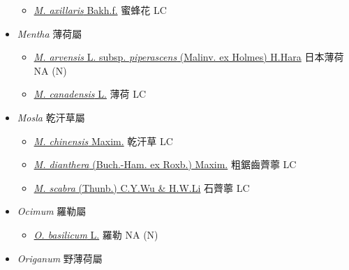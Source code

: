 \begin{itemize}
  \begin{itemize}
        \item[] \href{http://www.theplantlist.org/tpl1.1/search?q=Melissa+axillaris}{\textit{M. axillaris} Bakh.f.}   蜜蜂花   LC
  \end{itemize}
 \item[] \textit{Mentha} 薄荷屬
                                
  \begin{itemize}
        \item[] \href{http://www.theplantlist.org/tpl1.1/search?q=Mentha+arvensis+subsp.+piperascens}{\textit{M. arvensis} L. subsp. \textit{piperascens} (Malinv. ex Holmes) H.Hara}   日本薄荷   NA (N)
        \item[] \href{http://www.theplantlist.org/tpl1.1/search?q=Mentha+canadensis}{\textit{M. canadensis} L.}   薄荷   LC
  \end{itemize}
 \item[] \textit{Mosla} 乾汗草屬
                                
  \begin{itemize}
        \item[] \href{http://www.theplantlist.org/tpl1.1/search?q=Mosla+chinensis}{\textit{M. chinensis} Maxim.}   乾汗草   LC
        \item[] \href{http://www.theplantlist.org/tpl1.1/search?q=Mosla+dianthera}{\textit{M. dianthera} (Buch.-Ham. ex Roxb.) Maxim.}   粗鋸齒薺薴   LC
        \item[] \href{http://www.theplantlist.org/tpl1.1/search?q=Mosla+scabra}{\textit{M. scabra} (Thunb.) C.Y.Wu \& H.W.Li}   石薺薴   LC
  \end{itemize}
 \item[] \textit{Ocimum} 羅勒屬
                                
  \begin{itemize}
        \item[] \href{http://www.theplantlist.org/tpl1.1/search?q=Ocimum+basilicum}{\textit{O. basilicum} L.}   羅勒   NA (N)
  \end{itemize}
 \item[] \textit{Origanum} 野薄荷屬
                                

\end{itemize}
